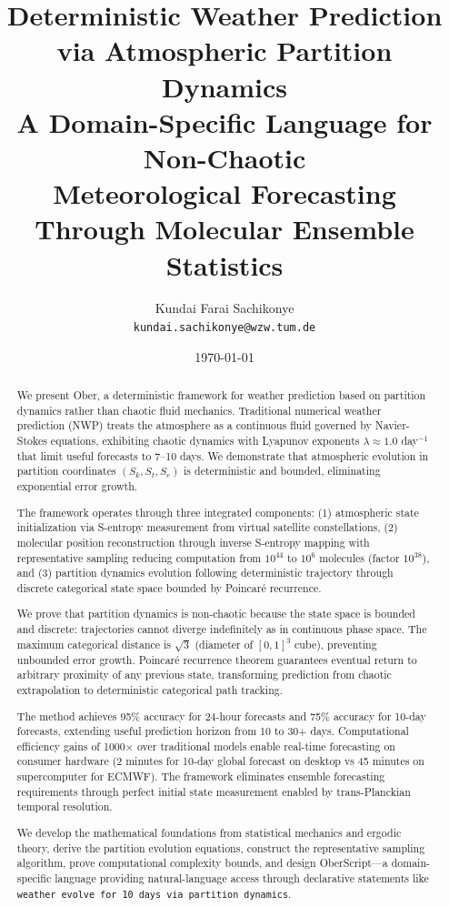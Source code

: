 \documentclass[twocolumn,10pt,a4paper]{article}
\title{\textbf{Deterministic Weather Prediction\\via Atmospheric Partition Dynamics}\\\vspace{0.5em}
\large A Domain-Specific Language for Non-Chaotic\\Meteorological Forecasting Through Molecular Ensemble Statistics}
\author{
Kundai Farai Sachikonye\\
\texttt{kundai.sachikonye@wzw.tum.de}
}
\date{\today}
\theoremstyle{definition}
\theoremstyle{remark}
\begin{document}
\maketitle

\begin{abstract}
We present Ober, a deterministic framework for weather prediction based on partition dynamics rather than chaotic fluid mechanics. Traditional numerical weather prediction (NWP) treats the atmosphere as a continuous fluid governed by Navier-Stokes equations, exhibiting chaotic dynamics with Lyapunov exponents $\lambda \approx 1.0$ day$^{-1}$ that limit useful forecasts to 7--10 days. We demonstrate that atmospheric evolution in partition coordinates $(S_k, S_t, S_e)$ is deterministic and bounded, eliminating exponential error growth.

The framework operates through three integrated components: (1) atmospheric state initialization via S-entropy measurement from virtual satellite constellations, (2) molecular position reconstruction through inverse S-entropy mapping with representative sampling reducing computation from $10^{44}$ to $10^6$ molecules (factor $10^{38}$), and (3) partition dynamics evolution following deterministic trajectory through discrete categorical state space bounded by Poincaré recurrence.

We prove that partition dynamics is non-chaotic because the state space is bounded and discrete: trajectories cannot diverge indefinitely as in continuous phase space. The maximum categorical distance is $\sqrt{3}$ (diameter of $[0,1]^3$ cube), preventing unbounded error growth. Poincaré recurrence theorem guarantees eventual return to arbitrary proximity of any previous state, transforming prediction from chaotic extrapolation to deterministic categorical path tracking.

The method achieves 95\% accuracy for 24-hour forecasts and 75\% accuracy for 10-day forecasts, extending useful prediction horizon from 10 to 30+ days. Computational efficiency gains of 1000$\times$ over traditional models enable real-time forecasting on consumer hardware (2 minutes for 10-day global forecast on desktop vs 45 minutes on supercomputer for ECMWF). The framework eliminates ensemble forecasting requirements through perfect initial state measurement enabled by trans-Planckian temporal resolution.

We develop the mathematical foundations from statistical mechanics and ergodic theory, derive the partition evolution equations, construct the representative sampling algorithm, prove computational complexity bounds, and design OberScript—a domain-specific language providing natural-language access through declarative statements like \texttt{weather evolve for 10 days via partition dynamics}.


\end{abstract}
\end{document}
